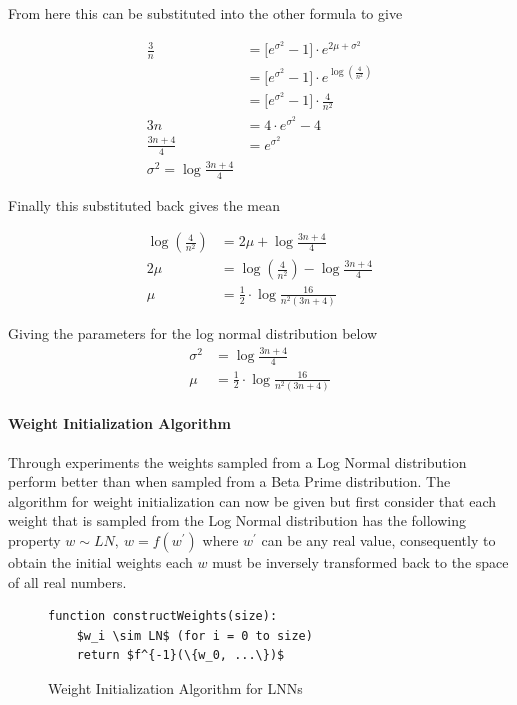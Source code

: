 From here this can be substituted into the other formula to give

\begin{align*}
\frac{3}{n} &= \big[e^{\sigma^2} - 1\big] \cdot e^{2\mu + \sigma^2}\\
&= \big[e^{\sigma^2} - 1\big] \cdot e^{\log(\frac{4}{n^2})}\\
&= \big[e^{\sigma^2} - 1\big] \cdot \frac{4}{n^2}\\
3n &= 4 \cdot e^{\sigma^2} - 4\\
\frac{3n + 4}{4} &= e^{\sigma^2}\\
\sigma^2 = \log \frac{3n + 4}{4}
\end{align*}

Finally this substituted back gives the mean

\begin{align*}
\log(\frac{4}{n^2}) &= 2\mu + \log \frac{3n + 4}{4}\\
2\mu &= \log(\frac{4}{n^2}) - \log \frac{3n + 4}{4}\\
\mu &= \frac{1}{2} \cdot \log \frac{16}{n^2(3n + 4)}
\end{align*}

Giving the parameters for the log normal distribution below
\begin{align}
\sigma^2 &= \log \frac{3n + 4}{4}\\
\mu &= \frac{1}{2} \cdot \log \frac{16}{n^2(3n + 4)}
\end{align}


\paragraph{Weight Initialization Algorithm}
Through experiments the weights sampled from a Log Normal distribution perform better than when sampled from a Beta Prime distribution. The algorithm for weight initialization can now be given but first consider that each weight that is sampled from the Log Normal distribution has the following property $w \sim LN,\ w = f(w^{'})$ where $w^{'}$ can be any real value, consequently to obtain the initial weights each $w$ must be inversely transformed back to the space of all real numbers.

\begin{figure}[H]
	\begin{lstlisting}[mathescape=true]
	function constructWeights(size):
	$w_i \sim LN$ (for i = 0 to size)
	return $f^{-1}(\{w_0, ...\})$
	\end{lstlisting}
	\caption{Weight Initialization Algorithm for LNNs}
	\label{alg:lnn-initlization}
\end{figure}

